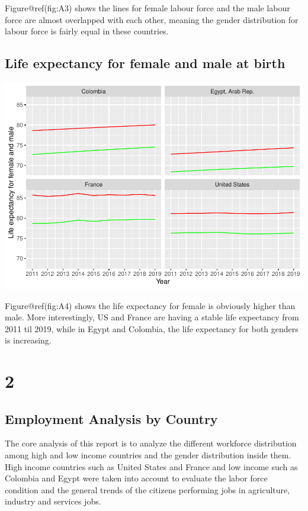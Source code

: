 \documentclass[
]{article}
\begin{document}
Figure@ref(fig:A3) shows the lines for female labour force and the male
labour force are almost overlapped with each other, meaning the gender
distribution for labour force is fairly equal in these countries.

\hypertarget{life-expectancy-for-female-and-male-at-birth}{%
\subsection{Life expectancy for female and male at
birth}\label{life-expectancy-for-female-and-male-at-birth}}

\includegraphics{The_Outsiders_5513_files/figure-latex/A4-1.pdf}

Figure@ref(fig:A4) shows the life expectancy for female is obviously
higher than male. More interestingly, US and France are having a stable
life expectancy from 2011 til 2019, while in Egypt and Colombia, the
life expectancy for both genders is increasing.

\clearpage

\section*{2}

\hypertarget{employment-analysis-by-country}{%
\subsection{Employment Analysis by
Country}\label{employment-analysis-by-country}}

The core analysis of this report is to analyze the different workforce
distribution among high and low income countries and the gender
distribution inside them. High income countries such as United States
and France and low income such as Colombia and Egypt were taken into
account to evaluate the labor force condition and the general trends of
the citizens performing jobs in agriculture, industry and services jobs.
\end{document}

